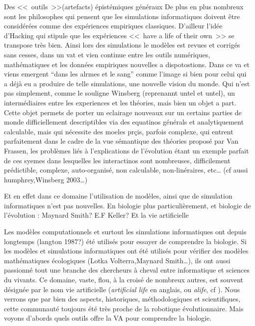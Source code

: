 {Des <<~outils~>>(artefacts) épistémiques généraux}
De plus en plus nombreux sont les philosophes qui pensent que les simulations informatiques doivent être considérées comme des expériences empiriques classiques. 
D'ailleur l'idée d'Hacking qui stipule que les expériences <<~have a life of their own~>> se transpose très bien. Ainsi lors des simulations le modèles est revues et corrigés sans cesses, dans un vat et vien continue entre les outils numériques, mathématiques et les données empiriques nouvelles a dispotostions. Dans ce va et viens emergent ``dans les alrmes et le sang'' comme l'image si bien \citet{winsberg09taletwomethods} pour celui qui a déjà eu a produire de telle simulations, une nouvelle vision du monde. Qui n'est pas simplement, comme le souligne Winsberg (reprenannt untel et untel), un intermédiaires entre les experiences et les théories, mais bien un objet a part. Cette objet permets de porter un eclairage nouveaux sur un certains parties de monde difficiellement descriptibles via des equatinos générals et analytiquement calculable, mais qui nécessite des moeles prçis, parfois complexe, qui entrent parfaitement dans le cadre de la vue sémantique des théories proposé par Van Frassen, les problèmes liés à l'explications de l'évolution étant un exemple parfait de ces syemes dans lesquelles les interactinos sont nombreuses, difficilement prédictible, complexe, auto-organisé, non calculable, non-linéraires, etc\dots
(cf aussi \citet{knuuttila02parserasepistemicartefact} humphrey,Winsberg 2003\ldots)

Et en effet dans ce domaine l'utilisation de modèles, ainsi que de simulation informatiques n'est pas nouvelles.
En biologie plus particulièrement, et biologie de l'évolution : Maynard Smith? E.F Keller? Et la vie artificielle

Les modèles computationnels et surtout les simulations informatiques ont depuis longtemps (langton 1987?) été utilisés pour essayer de comprendre la biologie. Si les modèles et simulations informatiques ont été utilisés pour vérifier des modèles mathématiques écologiques (Lotka Volterra,Maynard Smith\ldots), ils ont aussi passionné tout une branche des chercheurs à cheval entre informatique et sciences du vivants. Ce domaine, vaste, flou, à la croisé de nombreux autres, est souvent désignée par le nom vie artificielle (\emph{artificial life} en anglais, ou \emph{alife}, cf \citet{langton89alifeiproceedingsfirstinternationalworkshopsynthesissimulationlivingsystems}). Nous verrons que par bien des aspects, historiques, méthodologiques et scientifiques, cette communauté toujours été très proche de la robotique évolutionnaire. Mais voyons d'abords quels outils offre la VA pour comprendre la biologie.


